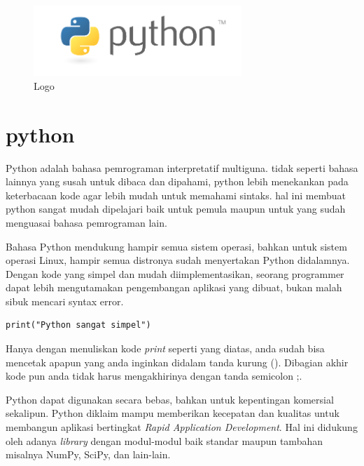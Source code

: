 
\sloppy

\begin{figure}[ht]
	\centerline{\includegraphics[width=0.70\textwidth]{figures/python}}
	\caption{Logo}
	\label{Logo}
\end{figure}

\section{python}
Python adalah bahasa pemrograman interpretatif multiguna. tidak seperti bahasa lainnya yang susah untuk dibaca dan dipahami, python lebih menekankan pada keterbacaan kode agar lebih mudah untuk memahami sintaks. hal ini membuat python sangat mudah dipelajari baik untuk pemula maupun untuk yang sudah menguasai bahasa pemrograman lain.

Bahasa Python mendukung hampir semua sistem operasi, bahkan untuk sistem operasi Linux, hampir semua distronya sudah menyertakan Python didalamnya. Dengan kode yang simpel dan mudah diimplementasikan, seorang programmer dapat lebih mengutamakan pengembangan aplikasi yang dibuat, bukan malah sibuk mencari syntax error.

\begin{verbatim}
print("Python sangat simpel")
\end{verbatim}

Hanya dengan menuliskan kode \textit{print} seperti yang diatas, anda sudah bisa mencetak apapun yang anda inginkan didalam tanda kurung (). Dibagian akhir kode pun anda tidak harus mengakhirinya dengan tanda semicolon ;.

Python dapat digunakan secara bebas, bahkan untuk kepentingan komersial sekalipun. Python diklaim mampu memberikan kecepatan dan kualitas untuk membangun aplikasi bertingkat \textit{Rapid Application Development}. Hal ini didukung oleh adanya \textit{library} dengan modul-modul baik standar maupun tambahan misalnya NumPy, SciPy, dan lain-lain.


